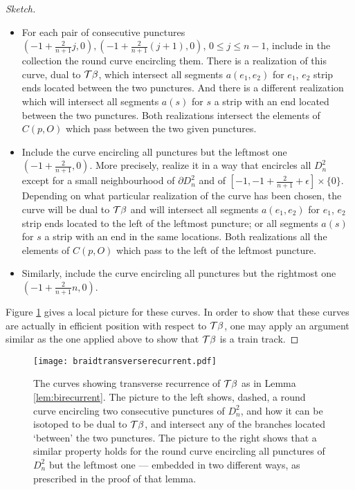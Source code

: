 \begin{proof}[Sketch]
\begin{itemize}
\item For each pair of consecutive punctures $\left(-1+\frac{2}{n+1}j,0\right), \left(-1+\frac{2}{n+1}(j+1),0\right)$, $0\leq j\leq n-1$, include in the collection the round curve encircling them. There is a realization of this curve, dual to ${\mathcal T}\beta$, which intersect all segments $a(e_1,e_2)$ for $e_1$, $e_2$ strip ends located between the two punctures. And there is a different realization which will intersect all segments $a(s)$ for $s$ a strip with an end located between the two punctures. Both realizations intersect the elements of $C(p,O)$ which pass between the two given punctures.
\item Include the curve encircling all punctures but the leftmost one $\left(-1+\frac{2}{n+1},0\right)$. More precisely, realize it in a way that encircles all $D^2_n$ except for a small neighbourhood of $\partial D^2_n$ and of $\left[-1, -1+\frac{2}{n+1}+\epsilon\right]\times \{0\}$. Depending on what particular realization of the curve has been chosen, the curve will be dual to ${\mathcal T}\beta$ and will intersect all segments $a(e_1,e_2)$ for $e_1$, $e_2$ strip ends located to the left of the leftmost puncture; or all segments $a(s)$ for $s$ a strip with an end in the same locations. Both realizations all the elements of $C(p,O)$ which pass to the left of the leftmost puncture.
\item Similarly, include the curve encircling all punctures but the rightmost one $\left(-1+\frac{2}{n+1}n,0\right)$.
\end{itemize}

Figure \ref{fig:dualcurves} gives a local picture for these curves. In order to show that these curves are actually in efficient position with respect to ${\mathcal T}\beta$, one may apply an argument similar as the one applied above to show that ${\mathcal T}\beta$ is a train track.
\end{proof}

\begin{figure}[h]
\centering
\texttt{[image: braidtransverserecurrent.pdf]}
\caption{\label{fig:dualcurves}The curves showing transverse recurrence of ${\mathcal T}\beta$ as in Lemma \ref{lem:birecurrent}. The picture to the left shows, dashed, a round curve encircling two consecutive punctures of $D^2_n$, and how it can be isotoped to be dual to ${\mathcal T}\beta$, and intersect any of the branches located `between' the two punctures. The picture to the right shows that a similar property holds for the round curve encircling all punctures of $D^2_n$  but the leftmost one --- embedded in two different ways, as prescribed in the proof of that lemma.}
\end{figure}


